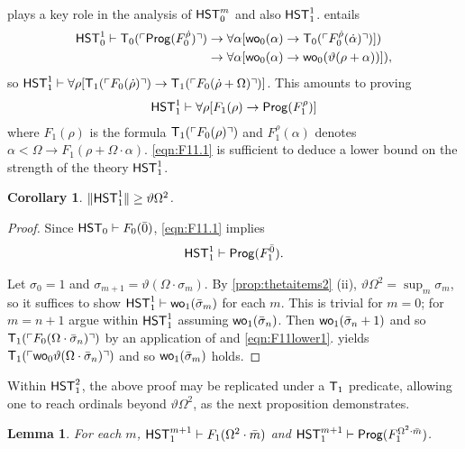 \documentclass[UKenglish,cleveref,DIV=12]{scrartcl}
\newtheorem{lemma}[theorem]{Lemma}%
\newtheorem{corollary}[lemma]{Corollary}
\theoremstyle{definition}
\theoremstyle{definition}
\begin{document}
 plays a key role in the analysis of $\mathsf{HST}_0^m$ and also $\mathsf{HST}_1^1$.  entails
\begin{align*}
 \mathsf{HST}_0^1\vdash\mathsf{T}_0(\ulcorner{\mathsf{Prog}(F_0^{\dot\rho})}\urcorner)
	&\rightarrow {\forall\alpha[\mathsf{wo}_0(\alpha)\rightarrow \mathsf{T}_0(\ulcorner{F_0^{\dot\rho}(\dot\alpha)}\urcorner)]})\\
	&\rightarrow {\forall\alpha[\mathsf{wo}_0(\alpha)\rightarrow \mathsf{wo}_0(\vartheta(\rho+\alpha))]}),
\end{align*}
so $\mathsf{HST}_1^1\vdash \forall\rho[\mathsf{T}_1(\ulcorner{F_0(\dot\rho)}\urcorner)\rightarrow \mathsf{T}_1(\ulcorner{F_0(\dot\rho+\Omega)}\urcorner)]$. This amounts to proving
\begin{align}\label{eqn:F11.1}
  \mathsf{HST}_1^1\vdash \forall\rho[{F_1(\rho)}\rightarrow \mathsf{Prog}  (F_1^\rho)]
\end{align}
where $F_1(\rho)$ is the formula $\mathsf{T}_1(\ulcorner{F_0(\rho)}\urcorner)$ and
$F_1^\rho(\alpha)$ denotes $\alpha<\Omega\rightarrow F_1(\rho+\Omega\cdot\alpha)$.
\eqref{eqn:F11.1} is sufficient to deduce a lower bound on the strength of the
theory $\mathsf{HST}_1^1$.
\begin{corollary}\label{cor:F11lowerbound}
  $\lVert{\mathsf{HST}_1^1}\rVert\ge\vartheta\Omega^2$.
\end{corollary}
\begin{proof}
Since $\mathsf{HST}_0\vdash F_0(\bar0)$, \eqref{eqn:F11.1} implies
\begin{gather}\label{eqn:F11lower1}
 \mathsf{HST}_1^1\vdash \mathsf{Prog} (F^{\bar 0}_1).
\end{gather}

Let $\sigma_0=1$ and $\sigma_{m+1}=\vartheta(\Omega\cdot\sigma_m)$. By
\cref{prop:thetaitems2} (ii), $\vartheta\Omega^2=\sup_m\sigma_m$, so it
suffices to show $\mathsf{HST}_1^1\vdash\mathsf{wo}_1(\bar\sigma_m)$ for each $m$. This is
trivial for $m=0$; for $m=n+1$ argue within $\mathsf{HST}_1^1$ assuming
$\mathsf{wo}_1(\bar\sigma_n)$. Then $\mathsf{wo}_1(\bar\sigma_n+1)$ and so $\mathsf{T}_1(\ulcorner{F_0(\Omega\cdot\bar\sigma_n)}\urcorner)$
by an application of  and \eqref{eqn:F11lower1}.  yields $\mathsf{T}_1(\ulcorner{\mathsf{wo}_0\vartheta(\Omega\cdot\bar\sigma_n)}\urcorner)$ and so $\mathsf{wo}_1(\bar\sigma_m)$
holds.
\end{proof}
Within $\mathsf{HST}_1^2$, the above proof may be replicated under a $\mathsf{T}_1$ predicate,
allowing one to reach ordinals beyond $\vartheta\Omega^2$, as the next
proposition demonstrates.
\begin{lemma}\label{prop:F1wellordering}
For each $m$, $\mathsf{HST}_1^{m+1}\vdash F_1(\Omega^2\cdot\bar m)$ and $\mathsf{HST}_1^{m+1}\vdash \mathsf{Prog}  (F_1^{\Omega^2\cdot\bar m})$.
\end{lemma}
\end{document}
